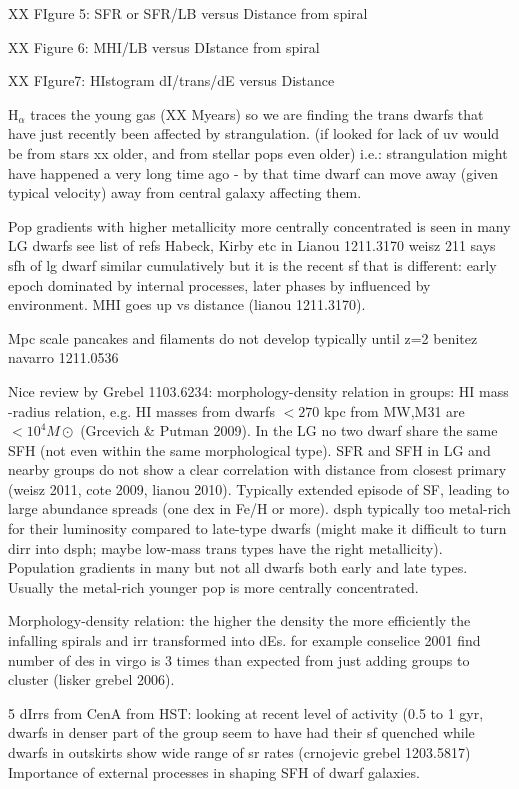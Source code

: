 \documentclass[12pt,preprint]{emulateapj}
\begin{document}
XX FIgure 5: SFR or SFR/LB versus Distance from spiral

XX Figure 6: MHI/LB versus DIstance from spiral

XX FIgure7: HIstogram dI/trans/dE versus Distance

H$_\alpha$ traces the young gas (XX Myears) so we are finding the trans dwarfs that have just recently been affected by strangulation. (if looked for lack 
of uv would be from stars xx older, and from stellar pops even older) i.e.: strangulation might have happened a very long time ago - by that time dwarf can 
move away (given typical velocity) away from central galaxy affecting them.

Pop gradients with higher metallicity more centrally concentrated is seen in many LG dwarfs see list of refs Habeck, Kirby etc in Lianou 1211.3170
weisz 211 says sfh of lg dwarf similar cumulatively but it is the recent sf that is different: early epoch dominated by internal processes, later phases by 
influenced by environment. MHI goes up vs distance (lianou 1211.3170).

Mpc scale pancakes and filaments do not develop typically until z=2 benitez navarro 1211.0536

Nice review by Grebel 1103.6234: morphology-density relation in groups: HI mass -radius relation, e.g. HI masses from dwarfs $<270$ kpc from MW,M31 are
 $<10^4 M\odot$ (Grcevich \& Putman 2009). In the LG no two dwarf share the same SFH (not even within the same morphological type). SFR and SFH in 
 LG and nearby groups do not show a clear correlation with distance from closest primary (weisz 2011, cote 2009, lianou 2010). Typically extended episode 
of SF, leading to large abundance spreads (one dex in Fe/H or more). dsph typically too metal-rich for their luminosity compared to late-type dwarfs (might 
make it difficult to turn dirr into dsph; maybe low-mass trans types have the right metallicity). Population gradients in many but not all dwarfs both early and 
late types. Usually the metal-rich younger pop is more centrally concentrated.

Morphology-density relation: the higher the density the more efficiently the infalling spirals and irr transformed into dEs. for example conselice 2001 find 
number of des in virgo is 3 times than expected from just adding groups to cluster (lisker grebel 2006).

5 dIrrs from CenA from HST: looking at recent level of activity (0.5 to 1 gyr, dwarfs in denser part of the group seem to have had their sf quenched while 
dwarfs in outskirts show wide range of sr rates (crnojevic grebel 1203.5817) Importance of external processes in shaping SFH of dwarf galaxies.
\end{document}
